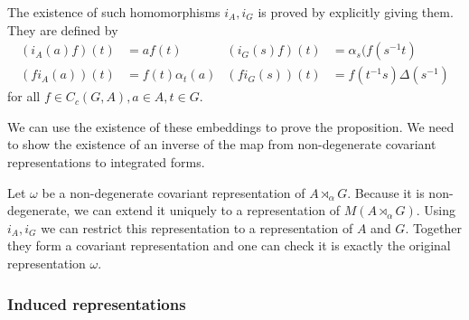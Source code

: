 The existence of such homomorphisms $i_A,i_G$ is proved by explicitly giving them.
They are defined by
\begin{align*}
(i_A(a)f)(t) &= af(t) & (i_G(s)f)(t) &= \alpha_s(f(s^{-1}t) \\
(fi_A(a))(t) &= f(t)\alpha_t(a) & (fi_G(s))(t) &= f(t^{-1}s)\Delta(s^{-1})
\end{align*}
for all $f\in C_c(G,A), a\in A, t\in G$.

We can use the existence of these embeddings to prove the proposition. We need to show the existence of an inverse of the map from non-degenerate covariant representations to integrated forms.

Let $\omega$ be a non-degenerate covariant representation of $A\rtimes_\alpha G$. Because it is non-degenerate, we can extend it uniquely to a representation of $M(A\rtimes_\alpha G)$. Using $i_A, i_G$ we can restrict this representation to a representation of $A$ and $G$. Together they form a covariant representation and one can check it is exactly the original representation $\omega$.

\subsubsection{Induced representations}